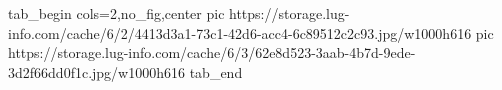  
 
 
 
 

\ifcmt
  tab_begin cols=2,no_fig,center
		 pic https://storage.lug-info.com/cache/6/2/4413d3a1-73c1-42d6-acc4-6c89512c2c93.jpg/w1000h616%
		 pic https://storage.lug-info.com/cache/6/3/62e8d523-3aab-4b7d-9ede-3d2f66dd0f1c.jpg/w1000h616%
  tab_end
\fi
